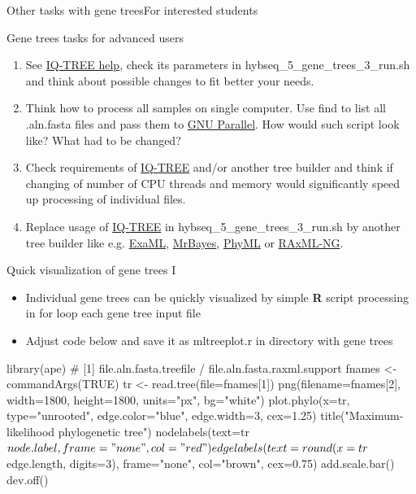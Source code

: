 \documentclass[compress, ucs, xelatex, 11pt, xcolor=x11names, aspectratio=169,
	hyperref={
		bookmarks=true,
		unicode=true,
		colorlinks=true,
		pdftitle={HybSeq course},
		plainpages=false,
		pdfauthor={Vojtech Zeisek},
		pdfsubject={Practical processing of HybSeq target enrichment sequencing data on computing grids like MetaCentrum},
		pdfcreator={XeLaTeX},
		pdfkeywords={BASH, command line, GNU, HybSeq, Linux, MetaCentrum, sequencing shell, target enrichment},
		linkcolor=Turquoise4, %
		anchorcolor=DodgerBlue4, %
		citecolor=DodgerBlue4, %
		filecolor=DodgerBlue4, %
		menucolor=Tan4, %
		urlcolor=DarkOliveGreen4, %
		pdftex},
	url={hyphens, lowtilde} %
	]{beamer}
\renewcommand{\texttt}[1]{\colorbox{Cornsilk2}{{\ttfamily #1}}}
\begin{document}
\begin{frame}{Other tasks with gene trees}{For interested students}
	\begin{exampleblock}{Gene trees tasks for advanced users}
		\begin{enumerate}
			\item See \href{http://www.iqtree.org/doc/Command-Reference}{IQ-TREE help}, check its parameters in \texttt{hybseq\_5\_gene\_trees\_3\_run.sh} and think about possible changes to fit better your needs.
			\item Think how to process all samples on single computer. Use \texttt{find} to list all \texttt{*.aln.fasta} files and pass them to \href{https://www.gnu.org/software/parallel/}{GNU Parallel}. How would such script look like? What had to be changed?
			\item Check requirements of \href{http://www.iqtree.org/}{IQ-TREE} and/or another tree builder and think if changing of number of CPU threads and memory would significantly speed up processing of individual files.
			\item Replace usage of \href{http://www.iqtree.org/}{IQ-TREE} in \texttt{hybseq\_5\_gene\_trees\_3\_run.sh} by another tree builder like e.g. \href{https://github.com/stamatak/ExaML}{ExaML}, \href{https://nbisweden.github.io/MrBayes/}{MrBayes}, \href{https://github.com/stephaneguindon/phyml}{PhyML} or \href{https://github.com/amkozlov/raxml-ng}{RAxML-NG}.
		\end{enumerate}
	\end{exampleblock}
\end{frame}

\begin{frame}[fragile]{Quick visualization of gene trees I}
	\begin{itemize}
		\item Individual gene trees can be quickly visualized by simple \textbf{R} script processing in \texttt{for} loop each gene tree input file
		\item Adjust code below and save it as \texttt{mltreeplot.r} in directory  with gene trees
	\end{itemize}
	\begin{spluscode}
    library(ape)
    # [1] file.aln.fasta.treefile / file.aln.fasta.raxml.support
    fnames <- commandArgs(TRUE)
    tr <- read.tree(file=fnames[1])
    png(filename=fnames[2], width=1800, height=1800, units="px", bg="white")
      plot.phylo(x=tr, type="unrooted", edge.color="blue", edge.width=3,
        cex=1.25)
      title("Maximum-likelihood phylogenetic tree")
      nodelabels(text=tr$node.label, frame="none", col="red")
      edgelabels(text=round(x=tr$edge.length, digits=3), frame="none",
        col="brown", cex=0.75)
      add.scale.bar()
      dev.off()
	\end{spluscode}
\end{frame}
\end{document}
